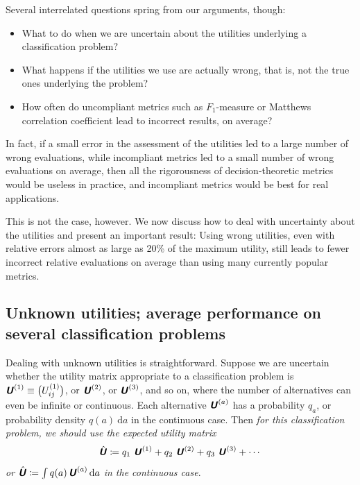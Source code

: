 \documentclass[\ifafour a4paper,12pt,\else a5paper,10pt,\fi%
onecolumn,oneside,article,%
british%
]{memoir}
\theoremstyle{remark}
\theoremstyle{innote}
\newcommand*{\mathte}[1]{\textbf{\textit{\textsf{#1}}}}
\newcommand*{\di}{\mathrm{d}}%
\newcommand*{\defd}{\coloneqq}
\renewcommand*{\|}[1][]{\nonscript\:#1\vert\nonscript\:\mathopen{}}
\newcommand*{\myhat}[1]{{\mkern1.5mu\skew{2}\hat{\mkern-1.5mu#1\mkern-1.5mu}\mkern 1.5mu}}
\newcommand*{\aveu}{\myhat{\mathte{U}}}
\newcommand*{\uncu}[1]{\mathte{U}^{(#1)}}
\begin{document}
Several interrelated questions spring from our arguments, though:
\begin{itemize}
\item What to do when we are uncertain about the utilities underlying a classification problem?
\item What happens if the utilities we use are actually wrong, that is, not the true ones underlying the problem?
\item How often do uncompliant metrics such as $F_{1}$-measure or Matthews correlation coefficient lead to incorrect results, on average?
\end{itemize}
In fact, if a small error in the assessment of the utilities led to a large number of wrong evaluations, while incompliant metrics led to a small number of wrong evaluations on average, then all the rigorousness of decision-theoretic metrics would be useless in practice, and  incompliant metrics would be best for real applications.

This is not the case, however. We now discuss how to deal with uncertainty about the utilities and present an important result: Using wrong utilities, even with relative errors almost as large as 20\% of the maximum utility, still leads to fewer incorrect relative evaluations on average than using many currently popular metrics.

\subsection{Unknown utilities; average performance on several classification problems}
\label{sec:unknown_utilities}

Dealing with unknown utilities is straightforward. Suppose we are uncertain whether the utility matrix appropriate to a classification problem is $\uncu{1} \equiv \bigl(U^{(1)}_{ij}\bigr)$, or $\uncu{2}$, or $\uncu{3}$, and so on, where the number of alternatives can even be infinite or continuous. Each alternative $\uncu{a}$ has a probability $q_a$, or probability density $q(a)\ \di a$ in the continuous case. Then \emph{for this classification problem, we should use the expected utility matrix
  \begin{equation}
    \label{eq:expe_UM}
    \aveu \defd q_{1}\ \uncu{1} + q_{2}\ \uncu{2} + q_{3}\ \uncu{3} + \dotsb
  \end{equation}
  or $\aveu \defd \int q(a)\, \uncu{a}\, \di a$ in the continuous case}.
\end{document}
